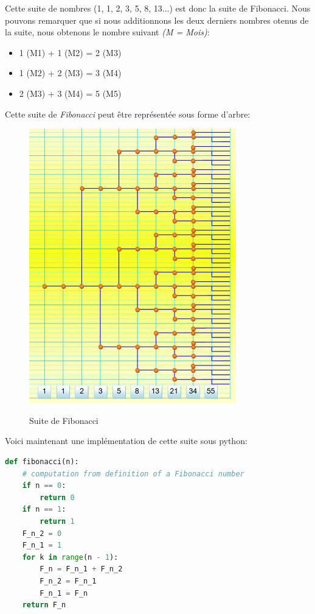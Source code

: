 \documentclass[french,11pt]{report}
\begin{document}
Cette suite de nombres (1, 1, 2, 3, 5, 8, 13...) est donc la suite de Fibonacci.
Nous pouvons remarquer que si nous additionnons les deux derniers nombres otenus de la suite, nous obtenons le nombre suivant \textit{(M = Mois)}:

\begin{itemize}
    \item 1 (M1) + 1 (M2) = 2 (M3)
    \item 1 (M2) + 2 (M3) = 3 (M4)  
    \item 2 (M3)  + 3 (M4) = 5 (M5) \\
\end{itemize}

Cette suite de \textit{Fibonacci} peut être représentée sous forme d'arbre:
\begin{figure} [!h]
    \centering
    \includegraphics[width=9cm]{arbre_fibo}
    \label{fig:arbre_fibo}
    \caption{Suite de Fibonacci}
\end{figure}

Voici maintenant une implémentation de cette suite sous python:


\begin{lstlisting}[language=python]
    def fibonacci(n):
	# computation from definition of a Fibonacci number
	if n == 0:
		return 0
	if n == 1:
		return 1
	F_n_2 = 0
	F_n_1 = 1
	for k in range(n - 1):
		F_n = F_n_1 + F_n_2
		F_n_2 = F_n_1
		F_n_1 = F_n
	return F_n
\end{lstlisting}
\end{document}

